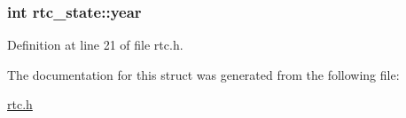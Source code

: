 \subsubsection[{year}]{\setlength{\rightskip}{0pt plus 5cm}int rtc\+\_\+state\+::year}\label{structrtc__state_a7b86720de6b1d03a768409a4f13b96c4}


Definition at line 21 of file rtc.\+h.



The documentation for this struct was generated from the following file\+:\begin{DoxyCompactItemize}
\item 
\hyperlink{rtc_8h}{rtc.\+h}\end{DoxyCompactItemize}
